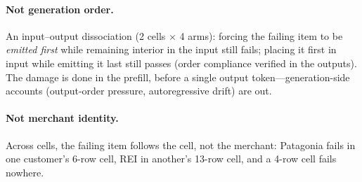 \paragraph{Not generation order.}
An input--output dissociation (2 cells $\times$ 4 arms): forcing the failing item to be \emph{emitted first}
while remaining interior in the input still fails; placing it first in input while emitting it last still
passes (order compliance verified in the outputs). The damage is done in the prefill, before a single output
token---generation-side accounts (output-order pressure, autoregressive drift) are out.

\paragraph{Not merchant identity.}
Across cells, the failing item follows the cell, not the merchant: Patagonia fails in one customer's 6-row
cell, REI in another's 13-row cell, and a 4-row cell fails nowhere.

